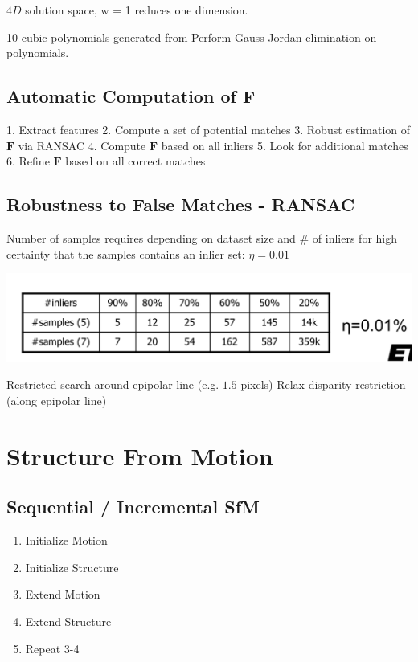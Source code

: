 $4D$ solution space, w = 1 reduces one dimension.

10 cubic polynomials generated from 
Perform Gauss-Jordan elimination on polynomials.

\subsection{Automatic Computation of $\mathbf{F}$}
1. Extract features
2. Compute a set of potential matches
3. Robust estimation of $\mathbf{F}$ via RANSAC  
4. Compute $\mathbf{F}$ based on all inliers
5. Look for additional matches
6. Refine $\mathbf{F}$ based on all correct matches

\subsection{Robustness to False Matches - RANSAC}

Number of samples requires depending on dataset size and \# of inliers for high certainty that the samples contains an inlier set:
$\eta = 0.01$

\includegraphics[width=0.9\columnwidth]{cv_figures/ransac.png}

Restricted search around epipolar line (e.g. $1.5$ pixels)
Relax disparity restriction (along epipolar line)

\section{Structure From Motion}
\subsection{Sequential / Incremental SfM}

\begin{enumerate}
\item  Initialize Motion
\item  Initialize Structure
\item  Extend Motion
\item  Extend Structure
\item Repeat 3-4
\end{enumerate}

